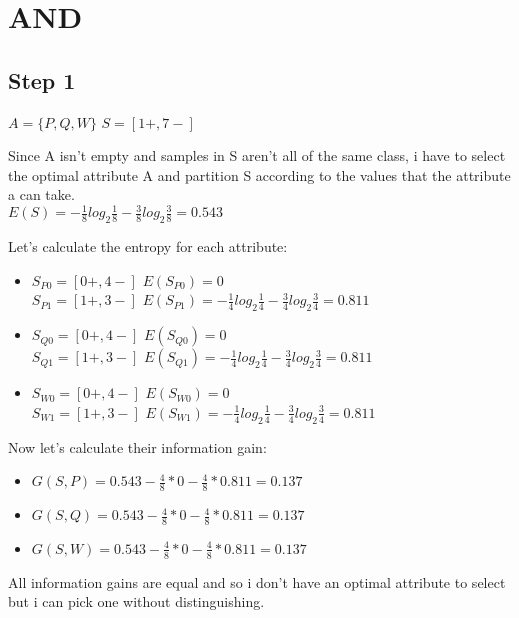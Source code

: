 \section{AND}
\subsection*{Step 1}
$A=\{P, Q, W\}$ $S=[1+,7-]$ \newline

Since A isn't empty and samples in S aren't all of the same class, i have to select the optimal attribute A and partition S according to the values that the attribute a can take. \\

$E(S)=-\frac{1}{8}log_2\frac{1}{8}-\frac{3}{8}log_2\frac{3}{8}=0.543$

Let's calculate the entropy for each attribute: \\
\begin{itemize}
  \item $S_{P0}=[0+,4-]$
    \hfill
    $E(S_{P0})=0$ \\
    
    $S_{P1}=[1+,3-]$
    \hfill
    $E(S_{P1})=-\frac{1}{4}log_2\frac{1}{4}-\frac{3}{4}log_2\frac{3}{4}=0.811$

  \item $S_{Q0}=[0+,4-]$
    \hfill
    $E(S_{Q0})=0$ \\

    $S_{Q1}=[1+,3-]$
    \hfill
    $E(S_{Q1})=-\frac{1}{4}log_2\frac{1}{4}-\frac{3}{4}log_2\frac{3}{4}=0.811$

  \item $S_{W0}=[0+,4-]$
    \hfill
    $E(S_{W0})=0$ \\

    $S_{W1}=[1+,3-]$
    \hfill
    $E(S_{W1})=-\frac{1}{4}log_2\frac{1}{4}-\frac{3}{4}log_2\frac{3}{4}=0.811$
\end{itemize}

Now let's calculate their information gain:
\begin{itemize}
  \item $G(S,P)=0.543-\frac{4}{8}*0 - \frac{4}{8}*0.811=0.137$
  \item $G(S,Q)=0.543-\frac{4}{8}*0 - \frac{4}{8}*0.811=0.137$
  \item $G(S,W)=0.543-\frac{4}{8}*0 - \frac{4}{8}*0.811=0.137$
\end{itemize}

All information gains are equal and so i don’t have an optimal attribute to select but i can pick one without distinguishing. \newline

